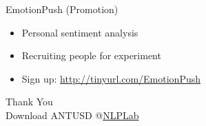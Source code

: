 \documentclass[compress]{beamer}
\begin{document}
    \begin{frame}{EmotionPush (Promotion)}

        \begin{itemize}
            \item Personal sentiment analysis
            \item Recruiting people for experiment
            \item Sign up: \url{http://tinyurl.com/EmotionPush}
        \end{itemize}
    \end{frame}

    \begin{frame}{}
        \begin{center}
            \huge{Thank You}\\
            \vspace{1cm}
            \normalsize{Download ANTUSD @\href{http://academiasinicanlplab.github.io/}{NLPLab}}
        \end{center}
    \end{frame}
\end{document}
